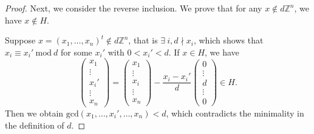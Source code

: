 \documentclass[10pt,a4paper]{amsart}
\begin{document}
\begin{proof}
Next, we consider the reverse inclusion. We prove that for any $x\not\in d\mathbb{Z}^n$, we have $x\not\in H$.

Suppose $x=(x_1,\dots,x_n)^t\not\in d\mathbb{Z}^n$, that is $\exists~ i, d\nmid x_i$, which shows that $x_i\equiv x_i'~\text{mod}~d$ for some $x_i'$ with $0<x_i'<d$. If $x\in H$, we have \begin{equation*}
    \left(\begin{smallmatrix}
        x_1\\
        \vdots\\
        x_i'\\
        \vdots\\
        x_n 
\end{smallmatrix}\right)=\left(\begin{smallmatrix}
         x_1\\
        \vdots\\
        x_i\\
        \vdots\\
        x_n 
    \end{smallmatrix}\right)-\frac{x_i-x_i'}{d}\left(\begin{smallmatrix}
         0\\
        \vdots\\
        d\\
        \vdots\\
        0
    \end{smallmatrix}\right)\in H.
\end{equation*}
Then we obtain $\text{gcd}(x_1,\dots,x_i',\dots,x_n)<d$, which contradicts the minimality in the definition of $d$.
\end{proof}
\end{document}
